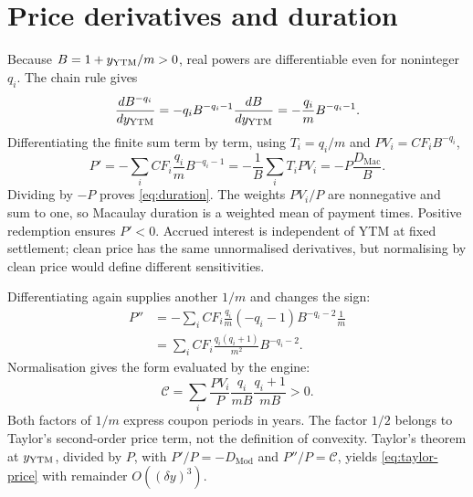 \section{Price derivatives and duration}\label{sec:app-derivatives}
Because \(B=1+y_{\mathrm{YTM}}/m>0\), real powers are differentiable even for noninteger \(q_i\). The chain rule gives
\[
\frac{d B^{-q_i}}{dy_{\mathrm{YTM}}}
=-q_iB^{-q_i-1}\frac{dB}{dy_{\mathrm{YTM}}}
=-\frac{q_i}{m}B^{-q_i-1}.
\]
Differentiating the finite sum term by term, using \(T_i=q_i/m\) and \(PV_i=CF_iB^{-q_i}\),
\begin{equation}\label{eq:app-duration}
P'=-\sum_i CF_i\frac{q_i}{m}B^{-q_i-1}
=-\frac1B\sum_iT_iPV_i
=-P\frac{D_{\mathrm{Mac}}}{B}.
\end{equation}
Dividing by \(-P\) proves \cref{eq:duration}. The weights \(PV_i/P\) are nonnegative and sum to one, so Macaulay duration is a weighted mean of payment times. Positive redemption ensures \(P'<0\). Accrued interest is independent of YTM at fixed settlement; clean price has the same unnormalised derivatives, but normalising by clean price would define different sensitivities.

Differentiating again supplies another \(1/m\) and changes the sign:
\begin{align*}
P''&=-\sum_i CF_i\frac{q_i}{m}
          (-q_i-1)B^{-q_i-2}\frac1m\\
&=\sum_i CF_i\frac{q_i(q_i+1)}{m^2}B^{-q_i-2}.
\end{align*}
Normalisation gives the form evaluated by the engine:
\begin{equation}\label{eq:app-convexity}
\mathcal C=\sum_i\frac{PV_i}{P}
                 \frac{q_i}{mB}\frac{q_i+1}{mB}>0.
\end{equation}
Both factors of \(1/m\) express coupon periods in years. The factor \(1/2\) belongs to Taylor's second-order price term, not the definition of convexity. Taylor's theorem at \(y_{\mathrm{YTM}}\), divided by \(P\), with \(P'/P=-D_{\mathrm{Mod}}\) and \(P''/P=\mathcal C\), yields \cref{eq:taylor-price} with remainder \(O((\delta y)^3)\).

